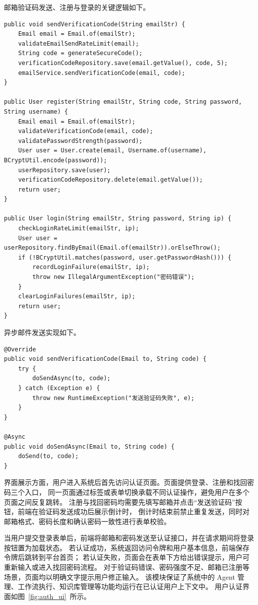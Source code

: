 邮箱验证码发送、注册与登录的关键逻辑如下。

\begin{lstlisting}[style=java, caption={UserAuthenticationDomainService 用户认证核心逻辑}]
public void sendVerificationCode(String emailStr) {
    Email email = Email.of(emailStr);
    validateEmailSendRateLimit(email);
    String code = generateSecureCode();
    verificationCodeRepository.save(email.getValue(), code, 5);
    emailService.sendVerificationCode(email, code);
}

public User register(String emailStr, String code, String password, String username) {
    Email email = Email.of(emailStr);
    validateVerificationCode(email, code);
    validatePasswordStrength(password);
    User user = User.create(email, Username.of(username), BCryptUtil.encode(password));
    userRepository.save(user);
    verificationCodeRepository.delete(email.getValue());
    return user;
}

public User login(String emailStr, String password, String ip) {
    checkLoginRateLimit(emailStr, ip);
    User user = userRepository.findByEmail(Email.of(emailStr)).orElseThrow();
    if (!BCryptUtil.matches(password, user.getPasswordHash())) {
        recordLoginFailure(emailStr, ip);
        throw new IllegalArgumentException("密码错误");
    }
    clearLoginFailures(emailStr, ip);
    return user;
}
\end{lstlisting}

异步邮件发送实现如下。

\begin{lstlisting}[style=java, caption={EmailServiceImpl 验证码异步发送}]
@Override
public void sendVerificationCode(Email to, String code) {
    try {
        doSendAsync(to, code);
    } catch (Exception e) {
        throw new RuntimeException("发送验证码失败", e);
    }
}

@Async
public void doSendAsync(Email to, String code) {
    doSend(to, code);
}
\end{lstlisting}


界面展示方面，用户进入系统后首先访问认证页面。页面提供登录、注册和找回密码三个入口，
同一页面通过标签或表单切换承载不同认证操作，避免用户在多个页面之间反复跳转。
注册与找回密码均需要先填写邮箱并点击“发送验证码”按钮，前端在验证码发送成功后展示倒计时，
倒计时结束前禁止重复发送，同时对邮箱格式、密码长度和确认密码一致性进行表单校验。

当用户提交登录表单后，前端将邮箱和密码发送至认证接口，并在请求期间将登录按钮置为加载状态。
若认证成功，系统返回访问令牌和用户基本信息，前端保存令牌后跳转到平台首页；
若认证失败，页面会在表单下方给出错误提示，用户可重新输入或进入找回密码流程。
对于验证码错误、密码强度不足、邮箱已注册等场景，页面均以明确文字提示用户修正输入。
该模块保证了系统中的 Agent 管理、工作流执行、知识库管理等功能均运行在已认证用户上下文中。
用户认证界面如图~\ref{fig:auth_ui}~所示。

